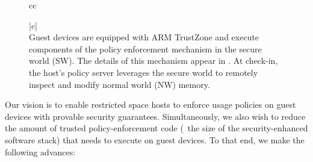\begin{figure}[t!]
\begin{tabular}{cc}
\begin{minipage}{0.46\textwidth}
\begin{tabular}{|c|}
\indent\vspace{-0.5cm}\\
{\small Guest devices are equipped with ARM TrustZone and execute components of
the policy enforcement mechanism in the secure world (SW). The details of this
mechanism appear in .  At check-in, the host's
policy server leverages the secure world to remotely inspect and modify normal
world (NW) memory.}\\
\hline
\end{tabular}
\end{minipage}
\end{tabular}
\indent\vspace{-0.1cm}
{\label{figure:restrictedspaces}}
\end{figure}

Our vision is to enable restricted space hosts to enforce usage policies on
guest devices with provable security guarantees. Simultaneously, we also wish
to reduce the amount of trusted policy-enforcement code (\ie~the size of the
security-enhanced software stack) that needs to execute on guest devices. To
that end, we make the following advances:

